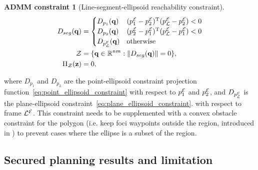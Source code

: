 \documentclass[10pt,twocolumn,twoside]{IEEEtran}
\newtheorem{constraint}{ADMM constraint}
\def\sZ{\mathcal{Z}}
\begin{document}
{\begin{constraint}[Line-segment-ellipsoid reachability constraint]
\begin{align}
D_{seg}(\vq) &=  \begin{cases}
D_{p_{1}}(\vq) & (\Eframe{p_1}-\Eframe{p_2})\transpose (\Eframe{p_{\cL}}-\Eframe{p_2})<0\\
D_{p_{2}}(\vq) & (\Eframe{p_2}-\Eframe{p_1})\transpose (\Eframe{p_{\cL}} -\Eframe{p_1})<0\\
D_\Eframe{p_{\cL}}(\vq) & \textrm{otherwise}
\end{cases} \label{eq:segment_ellipsoid_constraint}\\
  \sZ &= \{\vq\in\mathbb{R}^{nm}:\norm{D_{seg}(\vq)} = 0 \},\\
   \Pi_\sZ(\vz) & = 0, 
\end{align}
\end{constraint}
where $D_{p_{1}}$ and $D_{p_{2}}$ are the point-ellipsoid constraint projection function~\eqref{eq:point_ellipsoid_constraint} with respect to ${p_{1}^{\mathcal{E}}}$ and ${p_{2}^{\mathcal{E}}}$, and $D_{p_{\mathcal{L}}^{\mathcal{E}}}$ is the plane-ellipsoid constraint~\eqref{eq:plane_ellipsoid_constraint}. with respect to frame ${\mathcal{L}^{\mathcal{E}}}$.
This constraint needs to be supplemented with a convex obstacle constraint for the polygon (i.e. keep foci waypoints outside the region, introduced in \cite{yang2020multi}) to prevent cases where the ellipse is a subset of the region.
}
\subsection{Secured planning results and limitation}\label{sec:ADMM-simulation}
\end{document}
